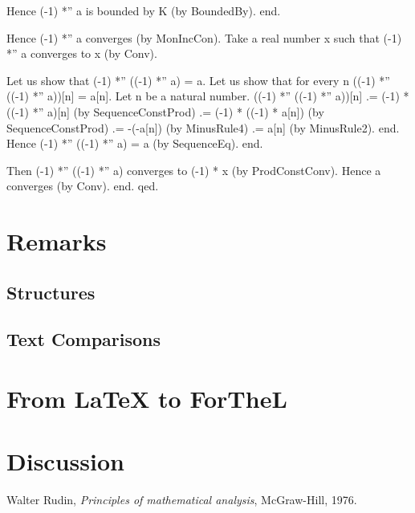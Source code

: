 \documentclass{article}
\newenvironment{forthel}{\begin{leftbar}}{\end{leftbar}}
\begin{document}
\begin{forthel}
	Hence (-1) *'' a is bounded by K (by BoundedBy).
	end.
	
	Hence (-1) *'' a converges (by MonIncCon).
	Take a real number x such that (-1) *'' a converges to x (by Conv).
	
	Let us show that (-1) *'' ((-1) *'' a) = a.
	Let us show that for every n ((-1) *'' ((-1) *'' a))[n] = a[n].
	Let n be a natural number.
	((-1) *'' ((-1) *'' a))[n] .= (-1) * ((-1) *'' a)[n] (by SequenceConstProd)
	.= (-1) * ((-1) * a[n]) (by SequenceConstProd)
	.= -(-a[n]) (by MinusRule4)
	.= a[n] (by MinusRule2).
	end.
	Hence (-1) *'' ((-1) *'' a) = a (by SequenceEq).
	end.
	
	Then (-1) *'' ((-1) *'' a) converges to (-1) * x (by ProdConstConv).
	Hence a converges (by Conv).
	end.
	qed.
	
\end{forthel}

\section{Remarks}
\subsection{Structures}


\subsection{Text Comparisons}



\section{{From \LaTeX} to ForTheL}



\section{Discussion}


\begin{thebibliography}{1}

  Walter Rudin,
  \textit{Principles of mathematical analysis},
  McGraw-Hill,
  1976.

\end{thebibliography}
  
\end{document}
